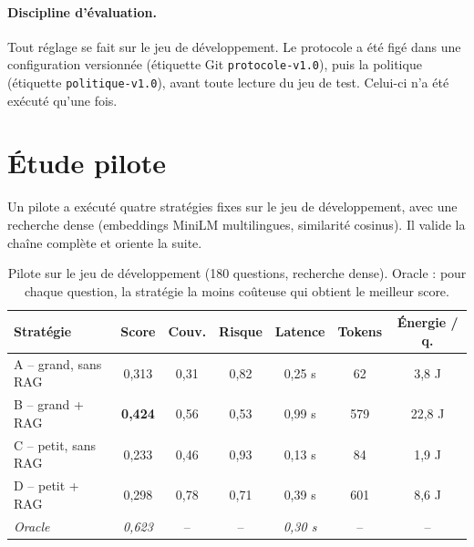 \documentclass[11pt,a4paper]{article}
\begin{document}
\paragraph{Discipline d'évaluation.} Tout réglage se fait sur le jeu de développement. Le protocole a
été figé dans une configuration versionnée (étiquette Git \texttt{protocole-v1.0}), puis la politique
(étiquette \texttt{politique-v1.0}), avant toute lecture du jeu de test. Celui-ci n'a été exécuté
qu'une fois.

\section{Étude pilote}\label{sec:pilote}

Un pilote a exécuté quatre stratégies fixes sur le jeu de développement, avec une recherche dense
(embeddings MiniLM multilingues, similarité cosinus). Il valide la chaîne complète et oriente la suite.

\begin{table}[H]
\centering\small
\begin{tabular}{l c c c c c c}
\toprule
\textbf{Stratégie} & \textbf{Score} & \textbf{Couv.} & \textbf{Risque} & \textbf{Latence} & \textbf{Tokens} & \textbf{Énergie / q.} \\
\midrule
A -- grand, sans RAG & 0,313 & 0,31 & 0,82 & 0,25 s & 62 & 3,8 J \\
B -- grand + RAG     & \textbf{0,424} & 0,56 & 0,53 & 0,99 s & 579 & 22,8 J \\
C -- petit, sans RAG & 0,233 & 0,46 & 0,93 & 0,13 s & 84 & 1,9 J \\
D -- petit + RAG     & 0,298 & 0,78 & 0,71 & 0,39 s & 601 & 8,6 J \\
\midrule
\textit{Oracle} & \textit{0,623} & -- & -- & \textit{0,30 s} & -- & -- \\
\bottomrule
\end{tabular}
\caption{Pilote sur le jeu de développement (180 questions, recherche dense). Oracle : pour chaque
question, la stratégie la moins coûteuse qui obtient le meilleur score.}
\label{tab:pilote}
\end{table}
\end{document}
